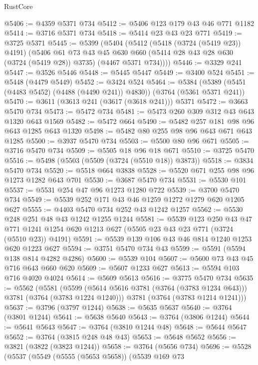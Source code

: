 \begin{lexlean}{RustCore}
\begin{coremodule}
@5406 := @4359 @5371 @734
@5412 := @5406 @123 @179 @43 @46 @771 @1182
@5414 := @3716 @5371 @734
@5418 := @5414 @23 @43 @23 @771
@5419 := @3725 @5371
@5445 := @5399
    (@5404
      (@5412
        (@5418 (@3724 (@5419 @23)) @4191)
        (@5406
          @61
          @73
          @43
          @45
          @630
          @660
          (@5414 @28 @43 @28 @630 (@3724 (@5419 @28)) @3735)
          (@4467 @5371 @734))))
@5446 := @3329 @241
@5447 := @3526 @5446
@5448 := @5445 @5447
@5449 := @3400 @524
@5451 := @5448 (@4479 @5449)
@5452 := @3424 @524
@5464 := @5384 (@5389 (@5451 (@4483 @5452) (@4488 (@4490 @241)) @4830)) (@3764 (@5361 @5371 @241))
@5470 := @3611 (@3613 @241 (@3617 (@3618 @241))) @5371
@5472 := @3663 @5470 @734
@5473 := @5472 @734
@5481 := @5473 @260 @309 @312 @43 @643 @1320 @643 @1569
@5482 := @5472 @664
@5490 := @5482 @257 @181 @98 @96 @643 @1285 @643 @1320
@5498 := @5482 @80 @255 @98 @96 @643 @671 @643 @1285
@5500 := @3937 @5470 @734
@5503 := @5500 @80 @96 @671
@5505 := @3716 @5470 @734
@5509 := @5505 @18 @96 @18 @671
@5510 := @3725 @5470
@5516 := @5498 (@5503 (@5509 (@3724 (@5510 @18)) @3873))
@5518 := @3834 @5470 @734
@5520 := @5518 @664 @3838
@5528 := @5520 @671 @255 @98 @96 @1273 @1282 @643 @701
@5530 := @3687 @5470 @734
@5531 := @5530 @101
@5537 := @5531 @254 @47 @96 @1273 @1280 @722
@5539 := @3700 @5470 @734
@5549 := @5539 @252 @171 @43 @46 @1259 @1272 @1279 @620 @1205 @627
@5555 := @4403 @5470 @734 @252 @43 @1242 @1257
@5562 := @5530 @248 @251 @48 @43 @1242 @1255 @1244
@5581 := @5539
    @123
    @250
    @43
    @47
    @771
    @1241
    @1254
    @620
    @1213
    @627
    (@5505 @23 @43 @23 @771 (@3724 (@5510 @23)) @4191)
@5591 := @5539 @139 @106 @43 @46 @814 @1240 @1253 @620 @1223 @627
@5594 := @3751 @5470 @734 @43
@5599 := @5591 (@5594 @138 @814 @4282 @4286)
@5600 := @5539 @104
@5607 := @5600 @73 @43 @45 @716 @643 @660 @620
@5609 := @5607 @1233 @627
@5613 := @5594 @103 @716 @4020 @4024
@5614 := @5609 @5613
@5616 := @3775 @5470 @734
@5635 := @5562
    (@5581
      (@5599 (@5614 @5616 @3781 (@3764 (@3783 @1234 @643))) @3781 (@3764 (@3783 @1224 @1240)))
      @3781
      (@3764 (@3783 @1214 @1241)))
@5637 := @3796 (@3797 @1244)
@5638 := @5635 @5637
@5640 := @3764 (@3801 @1244)
@5641 := @5638 @5640
@5643 := @3764 (@3806 @1244)
@5644 := @5641 @5643
@5647 := @3764 (@3810 @1244 @48)
@5648 := @5644 @5647
@5652 := @3764 (@3815 @248 @48 @43)
@5653 := @5648 @5652
@5656 := @3821 (@3822 (@3823 @1244))
@5658 := @3764 (@5656 @734)
@5696 := @5528
    (@5537
      (@5549
        (@5555 (@5653 @5658))
        (@5539
          @169
          @73

\end{coremodule}
\end{lexlean}
